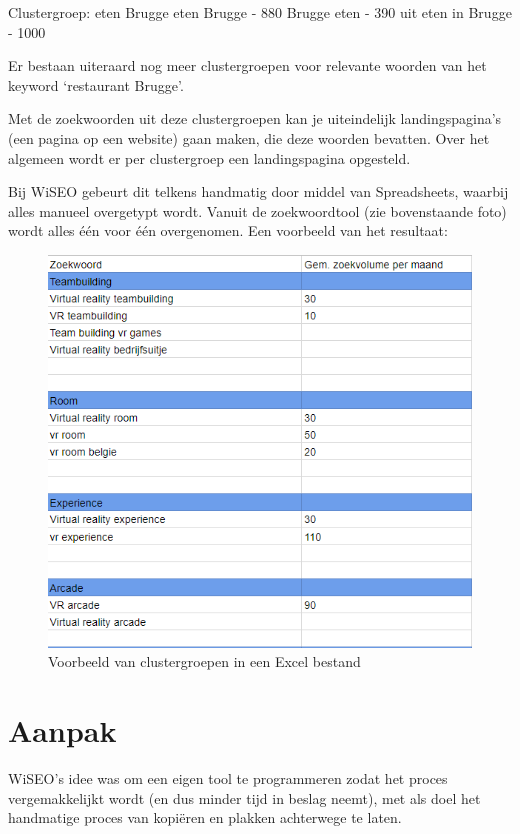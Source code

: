 Clustergroep: eten Brugge
eten Brugge - 880
Brugge eten - 390
uit eten in Brugge - 1000

Er bestaan uiteraard nog meer  clustergroepen voor relevante woorden van het keyword ‘restaurant Brugge’. 

Met de zoekwoorden uit deze clustergroepen kan je uiteindelijk landingspagina’s (een pagina op een website) gaan maken, die deze woorden bevatten. Over het algemeen wordt er per clustergroep een landingspagina opgesteld.  

Bij WiSEO gebeurt dit telkens handmatig door middel van Spreadsheets, waarbij alles manueel overgetypt wordt. Vanuit de zoekwoordtool (zie bovenstaande foto) wordt alles één voor één overgenomen. Een voorbeeld van het resultaat: 

\begin{figure}[h!]
\centering
\includegraphics[width=\linewidth]{img/Clustergroepenvoorbeeld.png}
\caption{Voorbeeld van clustergroepen in een Excel bestand}
\end{figure}

\section{Aanpak}
\label{ch: Aanpak}

WiSEO's idee was om een eigen tool te programmeren zodat het proces vergemakkelijkt wordt (en dus minder tijd in beslag neemt), met als doel het handmatige proces van kopiëren en plakken achterwege te laten. 

